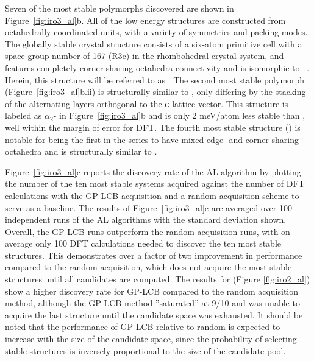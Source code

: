 %
Seven of the most stable \IrOthree polymorphs discovered are shown in Figure~\ref{fig:iro3_al}b.
%
All of the low energy \IrOthree structures are constructed from octahedrally coordinated units, with a variety of symmetries and packing modes.
%
The globally stable crystal structure consists of a six-atom primitive cell with a space group number of \num{167} (R$\overline{3}$c) in the rhombohedral crystal system, and features completely corner-sharing octahedra connectivity and is isomorphic to ~\cite{Hepworth1957}.
%
Herein, this structure will be referred to as \aIrOthree.
%
The second most stable polymorph (Figure~\ref{fig:iro3_al}b.ii) is structurally similar to \aIrOthree,
only differing by the stacking of the alternating layers orthogonal to the \textbf{c} lattice vector.
%
This structure is labeled as $\alpha_{2}$- in Figure~\ref{fig:iro3_al}b and is only 2 meV/atom less stable than \aIrOthree, well within the margin of error for DFT.
%
The fourth most stable structure (\rIOthree) is notable for being the first in the series to have mixed edge- and corner-sharing octahedra and is structurally similar to \rIrOtwo.


%
%
Figure~\ref{fig:iro3_al}c reports the discovery rate of the AL algorithm by plotting
the number of the ten most stable systems acquired against the number of DFT calculations with the GP-LCB acquisition and a random acquisition scheme to serve as a baseline.
%
The results of Figure~\ref{fig:iro3_al}c are averaged over \num{100} independent runs of the AL algorithms with the standard deviation shown.
%
Overall, the GP-LCB runs outperform the random acquisition runs, with on average only \num{100} DFT calculations needed to discover the ten most stable structures.
%
This demonstrates over a factor of two improvement in performance compared to the random acquisition, which does not acquire the most stable structures until all candidates are computed.
%
The results for \IrOtwo (Figure \ref{fig:iro2_al}) show a higher discovery rate for GP-LCB compared to the random acquisition method,
although the GP-LCB method ''saturated'' at \num{9/10} and was unable to acquire the last structure until the candidate space was exhausted.
%
It should be noted that the performance of GP-LCB relative to random is expected to increase with the size of the candidate space, since the probability of selecting stable structures is inversely proportional to the size of the candidate pool.


